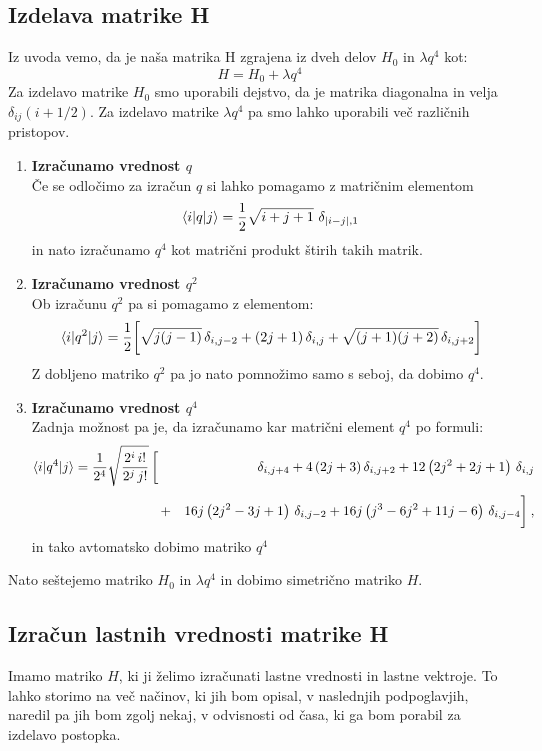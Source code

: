 \documentclass{article}
\begin{document}
\subsection{Izdelava matrike H}
Iz uvoda vemo, da je naša matrika H zgrajena iz dveh delov $H_0$ in $\lambda q^4$ kot:
\begin{equation*}
H = H_0 + \lambda q^4 
\end{equation*}
Za izdelavo matrike $H_0$ smo uporabili dejstvo, da je matrika diagonalna in velja $\delta_{ij}(i + 1/2)$. Za izdelavo matrike $\lambda q^4$ pa smo lahko uporabili več različnih pristopov.
\begin{enumerate}
    \item \textbf{Izračunamo vrednost $q$} \\
    Če se odločimo za izračun $q$ si lahko pomagamo z matričnim elementom 
    \begin{equation*}\langle i | q | j \rangle={1\over 2} \sqrt{i+j+1}\,\, \delta_{|i-j|,1} \>
    \end{equation*}
    in nato izračunamo $q^4$ kot matrični produkt štirih takih matrik.
    \item \textbf{Izračunamo vrednost $q^2$} \\
    Ob izračunu $q^2$ pa si pomagamo z elementom:
    \begin{equation*}
    \langle i|q^2|j\rangle = {1\over 2} \biggl[{\sqrt{j(j-1)}} \, \delta_{i,j-2}
     + {(2j+1)} \, \delta_{i,j}
    + {\sqrt{(j+1)(j+2)}} \, \delta_{i,j+2} \biggr]
    \end{equation*}
    Z dobljeno matriko $q^2$ pa jo nato pomnožimo samo s seboj, da dobimo $q^4$.
    \item \textbf{Izračunamo vrednost $q^4$} \\
    Zadnja možnost pa je, da izračunamo kar matrični element $q^4$ po formuli:
    \begin{eqnarray*}
    \langle i|q^4|j\rangle
    = {1\over 2^4}\sqrt{2^i \, i!\over 2^{j} \, j! } \, \biggl[ \,
     &\,& \delta_{i,j+4} + 4\left(2j+3\right) \delta_{i,j+2}
                      + 12 \left(2j^2+2j+1\right) \, \delta_{i,j} \\[3pt]
    &+& 16j \left(2j^2-3j+1\right) \, \delta_{i,j-2}
     + 16j\left(j^3-6j^2+11j-6\right) \, \delta_{i,j-4} \biggr] \>,
    \end{eqnarray*}
    in tako avtomatsko dobimo matriko $q^4$
\end{enumerate}
Nato seštejemo matriko $H_0$ in $\lambda q^4$ in dobimo simetrično matriko $H$.
\subsection{Izračun lastnih vrednosti matrike H}
Imamo matriko $H$, ki ji želimo izračunati lastne vrednosti in lastne vektroje. To lahko storimo na več načinov, ki jih bom opisal, v naslednjih podpoglavjih, naredil pa jih bom zgolj nekaj, v odvisnosti od časa, ki ga bom porabil za izdelavo postopka.
\end{document}
